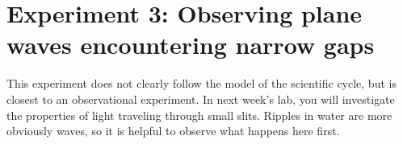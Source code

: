 %	
%	
%	
%
%
%	

\section{Experiment 3: Observing plane waves encountering narrow gaps}

This experiment does not clearly follow the model of the scientific cycle, but is closest to an observational experiment. In next week's lab, you will investigate the properties of light traveling through small slits. Ripples in water are more obviously waves, so it is helpful to observe what happens here first.

